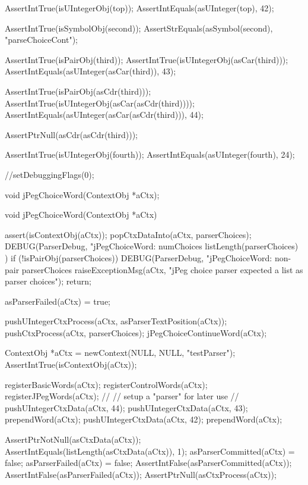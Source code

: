   AssertIntTrue(isUIntegerObj(top));
  AssertIntEquals(asUInteger(top), 42);    

  AssertIntTrue(isSymbolObj(second));
  AssertStrEquals(asSymbol(second), "parseChoiceCont");
  
  AssertIntTrue(isPairObj(third));
  AssertIntTrue(isUIntegerObj(asCar(third)));
  AssertIntEquals(asUInteger(asCar(third)), 43);
  
  AssertIntTrue(isPairObj(asCdr(third)));
  AssertIntTrue(isUIntegerObj(asCar(asCdr(third))));
  AssertIntEquals(asUInteger(asCar(asCdr(third))), 44);
  
  AssertPtrNull(asCdr(asCdr(third)));
  
  AssertIntTrue(isUIntegerObj(fourth));
  AssertIntEquals(asUInteger(fourth), 24);
  
  //setDebuggingFlags(0);
\stopCTest
\stopTestCase
\stopTestSuite

\startTestSuite[jPegChoiceWord]

\startCHeader
void jPegChoiceWord(ContextObj *aCtx);
\stopCHeader

\startCCode
void jPegChoiceWord(ContextObj *aCtx) {
  assert(isContextObj(aCtx));
  popCtxDataInto(aCtx, parserChoices);
  DEBUG(ParserDebug, "jPegChoiceWord: numChoices %
    listLength(parserChoices)
  )
  if (!isPairObj(parserChoices)) {
    DEBUG(ParserDebug, "jPegChoiceWord: non-pair parserChoices%
    raiseExceptionMsg(aCtx,
      "jPeg choice parser expected a list as parser choices");
    return;
  }
  
  asParserFailed(aCtx) = true;
  
  pushUIntegerCtxProcess(aCtx, asParserTextPosition(aCtx));
  pushCtxProcess(aCtx, parserChoices);
  jPegChoiceContinueWord(aCtx);
}
\stopCCode

\startCTest
  ContextObj *aCtx = newContext(NULL, NULL, "testParser");
  AssertIntTrue(isContextObj(aCtx));
  
  registerBasicWords(aCtx);
  registerControlWords(aCtx);
  registerJPegWords(aCtx);
  //
  // setup a "parser" for later use
  //
  pushUIntegerCtxData(aCtx, 44);
  pushUIntegerCtxData(aCtx, 43);
  prependWord(aCtx);
  pushUIntegerCtxData(aCtx, 42);
  prependWord(aCtx);
  
  AssertPtrNotNull(asCtxData(aCtx));
  AssertIntEquals(listLength(asCtxData(aCtx)), 1);
  asParserCommitted(aCtx) = false;
  asParserFailed(aCtx)    = false;
  AssertIntFalse(asParserCommitted(aCtx));
  AssertIntFalse(asParserFailed(aCtx));
  AssertPtrNull(asCtxProcess(aCtx));
  
